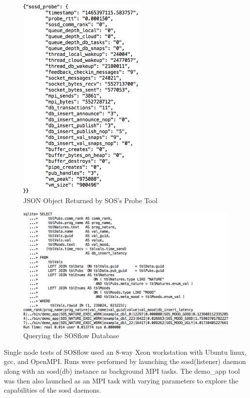 \begin{figure}[!t]
  \centering
  \includegraphics[width=2.5in]{images/probe_json_example.png}
  \caption{JSON Object Returned by SOS's Probe Tool}
  \label{probe_json}
\end{figure}

\begin{figure}[!t]
\centering
\includegraphics[width=5in]{images/query_example.png}
\caption{Querying the SOSflow Database}
\label{example query}
\end{figure}

Single node tests of SOSflow used an 8-way Xeon workstation with
Ubuntu linux, gcc, and OpenMPI.
%
Runs were performed by launching the sosd(listener) daemon along with
an sosd(db) instance as background MPI tasks.
%
The demo\_app tool was then also launched as an MPI task with varying
parameters to explore the capabilities of the sosd daemons.

